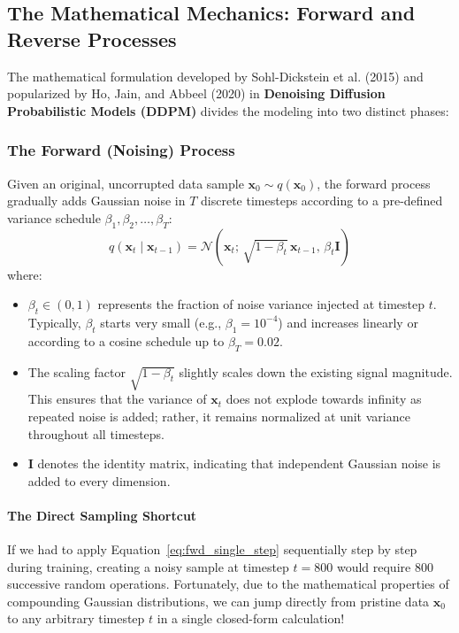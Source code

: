\subsection{The Mathematical Mechanics: Forward and Reverse Processes}\label{subsec:diffusion_math}

The mathematical formulation developed by Sohl-Dickstein et al. (2015) and popularized by Ho, Jain, and Abbeel (2020) in \textbf{Denoising Diffusion Probabilistic Models (DDPM)} divides the modeling into two distinct phases:

\subsubsection{The Forward (Noising) Process}
Given an original, uncorrupted data sample $\mathbf{x}_0 \sim q(\mathbf{x}_0)$, the forward process gradually adds Gaussian noise in $T$ discrete timesteps according to a pre-defined variance schedule $\beta_1, \beta_2, \dots, \beta_T$:
\begin{equation}
q(\mathbf{x}_t \mid \mathbf{x}_{t-1}) = \mathcal{N}\left(\mathbf{x}_t;\, \sqrt{1 - \beta_t}\,\mathbf{x}_{t-1},\, \beta_t \mathbf{I}\right)\label{eq:fwd_single_step}
\end{equation}
where:
\begin{itemize}
    \item $\beta_t \in (0, 1)$ represents the fraction of noise variance injected at timestep $t$. Typically, $\beta_t$ starts very small (e.g., $\beta_1 = 10^{-4}$) and increases linearly or according to a cosine schedule up to $\beta_T = 0.02$.
    \item The scaling factor $\sqrt{1 - \beta_t}$ slightly scales down the existing signal magnitude. This ensures that the variance of $\mathbf{x}_t$ does not explode towards infinity as repeated noise is added; rather, it remains normalized at unit variance throughout all timesteps.
    \item $\mathbf{I}$ denotes the identity matrix, indicating that independent Gaussian noise is added to every dimension.
\end{itemize}

\paragraph{The Direct Sampling Shortcut}
If we had to apply Equation~\eqref{eq:fwd_single_step} sequentially step by step during training, creating a noisy sample at timestep $t = 800$ would require $800$ successive random operations. Fortunately, due to the mathematical properties of compounding Gaussian distributions, we can jump directly from pristine data $\mathbf{x}_0$ to any arbitrary timestep $t$ in a single closed-form calculation!

